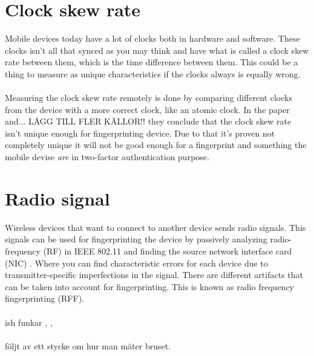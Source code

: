 \section{Clock skew rate}\label{sec:clockskew}
Mobile devices today have a lot of clocks both in hardware and software. These clocks isn't all that synced as you may think and have what is called a clock skew rate between them, which is the time difference between them. This could be a thing to measure as unique characteristics if the clocks always is equally wrong. \cite[]{clockSkew}\\
\\
Measuring the clock skew rate remotely is done by comparing different clocks from the device with a more correct clock, like an atomic clock.
In the paper~\cite[]{clockSkew} and... LÄGG TILL FLER KÄLLOR!! they conclude that the clock skew rate isn't unique enough for fingerprinting device. Due to that it's proven not completely unique it will not be good enough for a fingerprint and something the mobile devise \textit{are} in two-factor authentication purpose. 

\section{Radio signal}\label{sec:radiosignal}
Wireless devices that want to connect to another device sends radio signals. This signals can be used for fingerprinting the device by passively analyzing radio-frequency (RF) in IEEE 802.11 and finding the source network interface card (NIC) . Where you can find characteristic errors for each device due to transmitter-specific imperfections in the signal. There are different artifacts that can be taken into account for fingerprinting. This is known as radio frequency fingerprinting (RFF). \cite[]{rff:wifiDeviceSign}\\
\\


ish funkar \cite[]{rff:identWiFi} , \cite[]{rff:passiveDLLwifi}, \cite[]{rff:wifiDeviceSign}\\
\\
följt av ett stycke om hur man mäter bruset.
